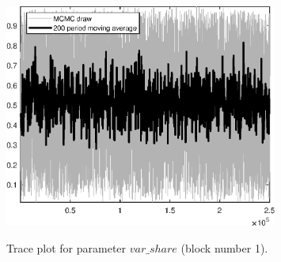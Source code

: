 \begin{figure}[H]
\centering
  \includegraphics[width=0.8\textwidth]{directed_search_est_alt_obs/graphs/TracePlot_var_share_blck_1}\\
    \caption{Trace plot for parameter $var\_share$ (block number 1).}
\end{figure}
